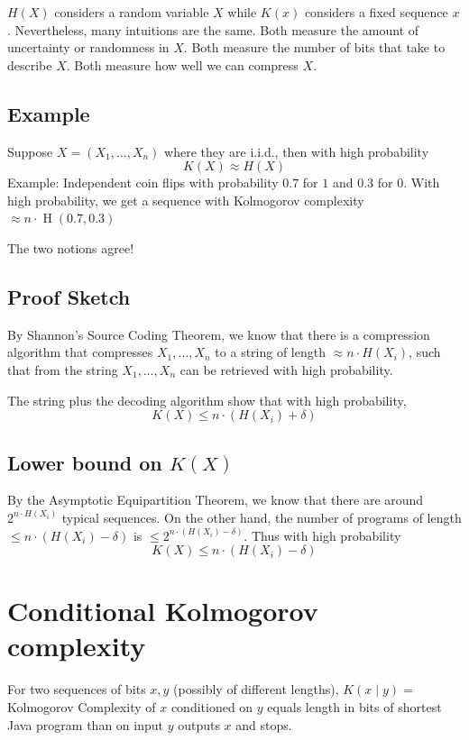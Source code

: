 \documentclass{article}
\begin{document}
$H(X)$ considers a random variable $X$ while $K(x)$ considers a fixed sequence $x$. Nevertheless, many intuitions are the same. Both measure the amount of uncertainty or randomness in $X$. Both measure the number of bits that take to describe $X$. Both measure how well we can compress $X$.

\subsection{Example}

Suppose $X=\left(X_1,\ldots,X_n\right)$ where they are i.i.d., then with high probability 
\[
K(X) \approx H(X)
\]
Example: Independent coin flips with probability $0.7$ for $1$ and $0.3$ for $0$. With high probability, we get a sequence with Kolmogorov complexity $\approx n\cdot \operatorname{H}(0.7,0.3)$

The two notions agree!

\subsection{Proof Sketch}

By Shannon's Source Coding Theorem, we know that there is a compression algorithm that compresses $X_1,\ldots,X_n$ to a string of length $\approx n\cdot H(X_i)$, such that from the string $X_1,\ldots,X_n$ can be retrieved with high probability.

The string plus the decoding algorithm show that with high probability,
\[
K(X) \leq n\cdot \left(H(X_i) + \delta\right)
\]

\subsection{Lower bound on $K(X)$}

By the Asymptotic Equipartition Theorem, we know that there are around $2^{n\cdot H(X_i)}$ typical sequences. On the other hand, the number of programs of length $\leq n \cdot \left(H(X_i) -\delta\right)$ is $\leq 2^{n \cdot \left(H(X_i) -\delta\right)}$. Thus with high probability
\[
K(X) \leq n \cdot \left(H(X_i) -\delta\right)
\]

\section{Conditional Kolmogorov complexity}

For two sequences of bits $x,y$ (possibly of different lengths), $K(x\mid y)=$ Kolmogorov Complexity of $x$ conditioned on $y$ equals length in bits of shortest Java program than on input $y$ outputs $x$ and stops.
\end{document}
